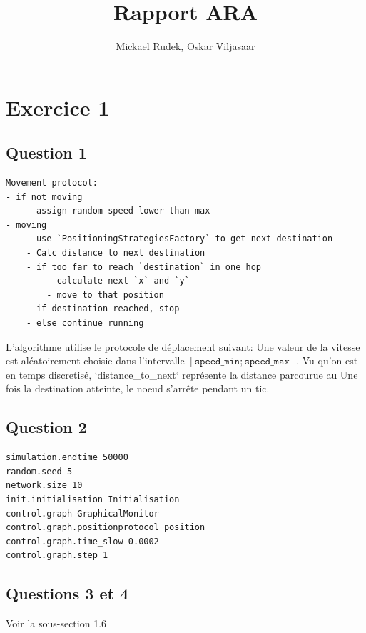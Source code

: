 \documentclass[a4paper]{article}
\title{Rapport ARA}
\author{Mickael Rudek, Oskar Viljasaar}
\begin{document}
\maketitle


\section{Exercice 1}
\subsection{Question 1}

\begin{verbatim}
Movement protocol:
- if not moving
    - assign random speed lower than max
- moving
    - use `PositioningStrategiesFactory` to get next destination
    - Calc distance to next destination
    - if too far to reach `destination` in one hop
        - calculate next `x` and `y`
        - move to that position
    - if destination reached, stop
    - else continue running
\end{verbatim}
L'algorithme utilise le protocole de déplacement suivant:
Une valeur de la vitesse est aléatoirement choisie dans l'intervalle
$ \left[ \texttt{speed\_min}; \texttt{speed\_max} \right] $.
Vu qu'on est en temps discretisé, `distance\_to\_next` représente la distance parcourue au
 Une fois la destination atteinte, le noeud s'arrête pendant un tic.


 \subsection{Question 2}

\begin{verbatim}
simulation.endtime 50000
random.seed 5
network.size 10
init.initialisation Initialisation
control.graph GraphicalMonitor
control.graph.positionprotocol position
control.graph.time_slow 0.0002
control.graph.step 1
\end{verbatim}

\subsection{Questions 3 et 4}
Voir la sous-section 1.6
\end{document}
